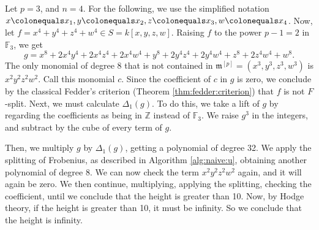 \begin{ex}
    Let \(p=3\), and \(n = 4\).
    For the following, we use the simplified notation
    \(x \colonequals x_{1}, y \colonequals x_{2}, z \colonequals x_{3}, w \colonequals x_{4}\).
    Now, let
    \(f = x^4 + y^4 + z^4 + w^4 \in S = k[x,y,z,w]\).
    Raising \(f\) to the power \(p-1 = 2\) in \(\mathbb{F}_{3}\), we get
    \[
    g = x^8 + 2x^4y^4 + 2x^4z^4 + 2x^4w^4 + y^8 + 2y^4z^4 + 2y^4w^4 + z^8 + 2z^4w^4 + w^8
    .\]
    The only monomial of degree \(8\) that is not contained
    in \(\mathfrak{m}^{[p]} = (x^{3}, y^{3}, z^{3}, w^{3})\) is \(x^{2}y^{2}z^{2}w^{2}\).
    Call this monomial \(c\).
    Since the coefficient of \(c\) in \(g\) is zero, we conclude
    by the classical Fedder's criterion (Theorem \ref{thm:fedder:criterion})
    that \(f\) is not \(F\)-split.
    Next, we must calculate \(\Delta_{1}(g)\).
    To do this, we take a lift of \(g\) by regarding the coefficients
    as being in \(\mathbb{Z}\) instead of \(\mathbb{F}_{3}\).
    We raise \(g^3\) in the integers, and subtract by the cube of every term of \(g\).

    Then, we multiply \(g\) by \(\Delta_{1}(g)\), getting a polynomial of degree 32.
    We apply the splitting of Frobenius, as described in Algorithm \ref{alg:naive:u}, 
    obtaining another polynomial of degree \(8\). 
    We can now check the term \(x^2y^2z^2w^2\) again, and it will again be zero. 
    We then continue, multiplying, applying the splitting, checking the coefficient, 
    until we conclude that the height is greater than 10. 
    Now, by Hodge theory, if the height is greater than 10, it must be infinity. 
    So we conclude that the height is infinity.
\end{ex}
